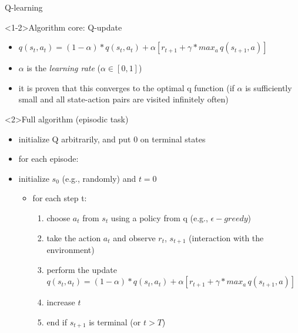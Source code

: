 \documentclass[presentation, 9pt]{beamer}\mode<presentation>{\usetheme{AMSBolognaFC}}
\begin{document}
\begin{frame}{Q-learning}
	\begin{exampleblock}<1-2>{Algorithm core: Q-update}
		\begin{itemize}
			\item $ q(s_t, a_t) = (1 - \alpha) * q(s_t, a_t) + \alpha [r_{t+1} + \gamma * max_a \, q(s_{t+1}, a)] $
			\item $\alpha$ is the \emph{learning rate} ($\alpha \in [0,1]$)
			\item it is proven that this converges to the optimal q function (if $\alpha$ is sufficiently small and all state-action pairs are visited infinitely often)
		\end{itemize}
	\end{exampleblock}
	\begin{alertblock}{Full algorithm (episodic task)}
		\begin{itemize}
			\item initialize Q arbitrarily, and put 0 on terminal states
			\item for each episode:
			\item initialize $s_0$ (e.g., randomly) and $t = 0$
			\begin{itemize}
				\item for each step t:
				\begin{enumerate}
					\item choose $a_t$ from $s_t$ using a policy from q (e.g., $\epsilon-greedy$)
					\item take the action $a_t$ and observe $r_t$, $s_{t+1}$ (interaction with the environment)
					\item perform the update $q(s_t, a_t) = (1 - \alpha) * q(s_t, a_t) + \alpha [r_{t+1} + \gamma * max_a \, q(s_{t+1}, a)] $
					\item increase $t$
					\item end if $s_{t+1}$ is terminal (or $t > T$)
				\end{enumerate}
			\end{itemize}
		\end{itemize}
	\end{alertblock}
\end{frame}
\end{document}
